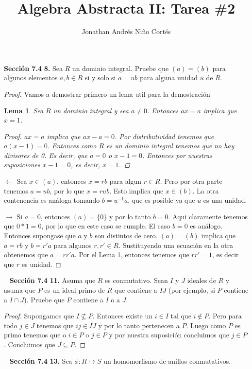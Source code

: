 \documentclass[letter,twoside,12pt]{article}
\title{Algebra Abstracta II: Tarea \#2}
\author{Jonathan Andr\'es Ni\~no Cort\'es}
\newtheorem{lemma}{Lema}
\begin{document}
\maketitle
\textbf{Secci\'on 7.4} \textbf{8.} Sea $R$ un dominio integral. Pruebe que $(a) = (b)$ para algunos elementos $a,b \in R$ si y solo si $a = ub$ para alguna unidad $u$ de $R$.
\begin{proof}
Vamos a demostrar primero un lema util para la demostraci\'on
\begin{lemma}
Sea $R$ un dominio integral y sea $a \not = 0$. Entonces $ax=a$ implica que $x=1$.
\begin{proof}
$ax=a$ implica que $ax-a=0$. Por distributividad tenemos que $a(x-1)=0$. Entonces como $R$ es un dominio integral tenemos que no hay divisores de 0. Es decir, que $a = 0$ o $x-1=0$. Entonces por nuestras suposiciones $x-1=0$, es decir, $x=1$.
\end{proof} 
\end{lemma}

$\leftarrow$ Sea $x \in (a)$, entonces $x=rb$ para algun $r \in R$. Pero por otra parte tenemos $a=ub$, por lo que $x=rub$. Esto implica que $x \in (b)$. La otra contenencia es an\'aloga tomando $b=u^{-1}a$, que es posible ya que $u$ es una unidad.

$\rightarrow$ Si $a=0$, entonces $(a)=\{0\}$ y por lo tanto $b=0$. Aqui claramente tenemos que $0*1=0$, por lo que en este caso se cumple. El caso $b=0$ es an\'alogo.
Entonces supongase que $a$ y $b$ son distintos de cero. $(a)=(b)$ implica que $a=rb$ y $b=r'a$ para algunos $r,r' \in R$. Sustituyendo una ecuaci\'on en la otra obtenemos que $a=rr'a$. Por el Lema 1, entonces tenemos que $rr'=1$, es decir que $r$ es unidad.   
\end{proof}
\newpage
\mbox{ }
\newpage
\textbf{Secci\'on 7.4} \textbf{11.} Asuma que $R$ es conmutativo. Sean $I$ y $J$ ideales de $R$ y asuma que $P$ es un ideal primo de $R$ que contiene a $IJ$ (por ejemplo, si $P$ contiene a $I \cap J$). Pruebe que $P$ contiene a $I$ o a $J$.
\begin{proof}
Supongamos que $I \not \subseteq P$. Entonces existe un $i \in I$ tal que $i \not \in P$. Pero para todo $j \in J$ tenemos que $ij \in IJ$ y por lo tanto pertenecen a $P$. Luego como $P$ es primo tenemos que o $i \in P$ o $j \in P$ y por nuestra suposici\'on concluimos que $j \in P$. Concluimos que $J \subseteq P$.  
\end{proof}
\newpage
\mbox{ }
\newpage
\textbf{Secci\'on 7.4} \textbf{13.} Sea  $\phi: R \mapsto S$ un homomorfismo de anillos conmutativos.
\end{document}
